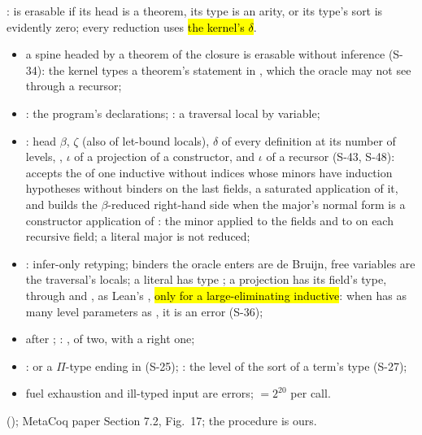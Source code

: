 \begin{definition}
  \label{def:Erasure-Pure-isErasable}
  \leanok
   :  is erasable if its head is a
  theorem, its type is an arity, or its type's sort is evidently zero; every reduction uses
  \hl{the kernel's $\delta$}.
  \begin{itemize}
  \item a spine headed by a theorem of the closure is erasable without inference (S-34): the
        kernel types a theorem's statement in , which the oracle may not see through
        a recursor;
  \item {}: the program's declarations; : a traversal local by variable;
  \item {}: head $\beta$, $\zeta$ (also of let-bound locals), $\delta$ of every
        definition at its number of levels, , $\iota$ of a projection of a
        constructor, and $\iota$ of a recursor (S-43, S-48):  accepts the
         of one inductive without indices whose minors have induction hypotheses
        without binders on the last fields,  a saturated application of it, and
         builds the $\beta$-reduced right-hand side when the major's normal form is
        a constructor application of : the minor applied to the fields and to
         on each recursive field; a  literal major is not reduced;
  \item {}: infer-only retyping; binders the oracle enters are de Bruijn, free
        variables are the traversal's locals; a  literal has type ; a
        projection has its field's type, through  and , as
        Lean's , \hl{only for a large-eliminating inductive}: when
         has as many level parameters as , it is an error (S-36);
  \item {} after ; : ,  of two,
         with a right one;
  \item {}:  or a $\Pi$-type ending in  (S-25);
        : the level of the sort of a term's type (S-27);
  \item fuel exhaustion and ill-typed input are errors;  $= 2^{20}$ per call.
  \end{itemize}
    (); MetaCoq paper
  Section 7.2, Fig.~17; the procedure is ours.
\end{definition}
